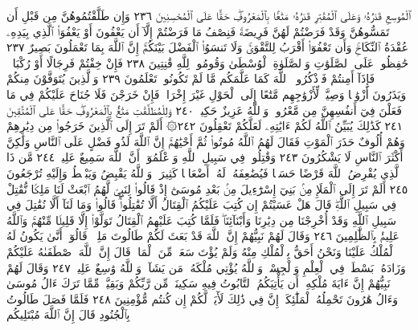 ٱلْمُوسِعِ قَدَرُهُۥ وَعَلَى ٱلْمُقْتِرِ قَدَرُهُۥ مَتَٰعَۢا بِٱلْمَعْرُوفِۖ حَقًّا عَلَى
ٱلْمُحْسِنِينَ ٢٣٦ وَإِن طَلَّقْتُمُوهُنَّ مِن قَبْلِ أَن تَمَسُّوهُنَّ وَقَدْ
فَرَضْتُمْ لَهُنَّ فَرِيضَةࣰ فَنِصْفُ مَا فَرَضْتُمْ إِلَّآ أَن يَعْفُونَ
أَوْ يَعْفُوَا۟ ٱلَّذِي بِيَدِهِۦ عُقْدَةُ ٱلنِّكَاحِۚ وَأَن تَعْفُوٓا۟ أَقْرَبُ لِلتَّقْوَىٰۚ
وَلَا تَنسَوُا۟ ٱلْفَضْلَ بَيْنَكُمْۚ إِنَّ ٱللَّهَ بِمَا تَعْمَلُونَ بَصِيرٌ ٢٣٧
حَٰفِظُوا۟ عَلَى ٱلصَّلَوَٰتِ وَٱلصَّلَوٰةِ ٱلْوُسْطَىٰ وَقُومُوا۟ لِلَّهِ
قَٰنِتِينَ ٢٣٨ فَإِنْ خِفْتُمْ فَرِجَالًا أَوْ رُكْبَانࣰاۖ فَإِذَآ أَمِنتُمْ
فَٱذْكُرُوا۟ ٱللَّهَ كَمَا عَلَّمَكُم مَّا لَمْ تَكُونُوا۟ تَعْلَمُونَ ٢٣٩
وَٱلَّذِينَ يُتَوَفَّوْنَ مِنكُمْ وَيَذَرُونَ أَزْوَٰجࣰا
وَصِيَّةࣰ لِّأَزْوَٰجِهِم مَّتَٰعًا إِلَى ٱلْحَوْلِ غَيْرَ إِخْرَاجࣲۚ فَإِنْ
خَرَجْنَ فَلَا جُنَاحَ عَلَيْكُمْ فِي مَا فَعَلْنَ فِيٓ أَنفُسِهِنَّ
مِن مَّعْرُوفࣲۗ وَٱللَّهُ عَزِيزٌ حَكِيمࣱ ٢٤٠ وَلِلْمُطَلَّقَٰتِ مَتَٰعُۢ
بِٱلْمَعْرُوفِۖ حَقًّا عَلَى ٱلْمُتَّقِينَ ٢٤١ كَذَٰلِكَ يُبَيِّنُ
ٱللَّهُ لَكُمْ ءَايَٰتِهِۦ لَعَلَّكُمْ تَعْقِلُونَ ٢٤٢۞ أَلَمْ تَرَ
إِلَى ٱلَّذِينَ خَرَجُوا۟ مِن دِيَٰرِهِمْ وَهُمْ أُلُوفٌ حَذَرَ ٱلْمَوْتِ
فَقَالَ لَهُمُ ٱللَّهُ مُوتُوا۟ ثُمَّ أَحْيَٰهُمْۚ إِنَّ ٱللَّهَ لَذُو فَضْلٍ
عَلَى ٱلنَّاسِ وَلَٰكِنَّ أَكْثَرَ ٱلنَّاسِ لَا يَشْكُرُونَ ٢٤٣
وَقَٰتِلُوا۟ فِي سَبِيلِ ٱللَّهِ وَٱعْلَمُوٓا۟ أَنَّ ٱللَّهَ سَمِيعٌ عَلِيمࣱ ٢٤٤ مَّن
ذَا ٱلَّذِي يُقْرِضُ ٱللَّهَ قَرْضًا حَسَنࣰا فَيُضَٰعِفَهُۥ لَهُۥٓ أَضْعَافࣰا
كَثِيرَةࣰۚ وَٱللَّهُ يَقْبِضُ وَيَبْصُۜطُ وَإِلَيْهِ تُرْجَعُونَ ٢٤٥
أَلَمْ تَرَ إِلَى ٱلْمَلَإِ مِنۢ بَنِيٓ إِسْرَٰٓءِيلَ مِنۢ بَعْدِ مُوسَىٰٓ إِذْ
قَالُوا۟ لِنَبِيࣲّ لَّهُمُ ٱبْعَثْ لَنَا مَلِكࣰا نُّقَٰتِلْ فِي سَبِيلِ ٱللَّهِۖ
قَالَ هَلْ عَسَيْتُمْ إِن كُتِبَ عَلَيْكُمُ ٱلْقِتَالُ أَلَّا تُقَٰتِلُوا۟ۖ
قَالُوا۟ وَمَا لَنَآ أَلَّا نُقَٰتِلَ فِي سَبِيلِ ٱللَّهِ وَقَدْ أُخْرِجْنَا
مِن دِيَٰرِنَا وَأَبْنَآئِنَاۖ فَلَمَّا كُتِبَ عَلَيْهِمُ ٱلْقِتَالُ تَوَلَّوْا۟
إِلَّا قَلِيلࣰا مِّنْهُمْۚ وَٱللَّهُ عَلِيمُۢ بِٱلظَّٰلِمِينَ ٢٤٦ وَقَالَ لَهُمْ
نَبِيُّهُمْ إِنَّ ٱللَّهَ قَدْ بَعَثَ لَكُمْ طَالُوتَ مَلِكࣰاۚ
قَالُوٓا۟ أَنَّىٰ يَكُونُ لَهُ ٱلْمُلْكُ عَلَيْنَا وَنَحْنُ أَحَقُّ
بِٱلْمُلْكِ مِنْهُ وَلَمْ يُؤْتَ سَعَةࣰ مِّنَ ٱلْمَالِۚ قَالَ إِنَّ ٱللَّهَ
ٱصْطَفَىٰهُ عَلَيْكُمْ وَزَادَهُۥ بَسْطَةࣰ فِي ٱلْعِلْمِ وَٱلْجِسْمِۖ
وَٱللَّهُ يُؤْتِي مُلْكَهُۥ مَن يَشَآءُۚ وَٱللَّهُ وَٰسِعٌ عَلِيمࣱ ٢٤٧
وَقَالَ لَهُمْ نَبِيُّهُمْ إِنَّ ءَايَةَ مُلْكِهِۦٓ أَن يَأْتِيَكُمُ
ٱلتَّابُوتُ فِيهِ سَكِينَةࣱ مِّن رَّبِّكُمْ وَبَقِيَّةࣱ مِّمَّا
تَرَكَ ءَالُ مُوسَىٰ وَءَالُ هَٰرُونَ تَحْمِلُهُ ٱلْمَلَٰٓئِكَةُۚ
إِنَّ فِي ذَٰلِكَ لَأٓيَةࣰ لَّكُمْ إِن كُنتُم مُّؤْمِنِينَ ٢٤٨
فَلَمَّا فَصَلَ طَالُوتُ بِٱلْجُنُودِ قَالَ إِنَّ ٱللَّهَ مُبْتَلِيكُم
